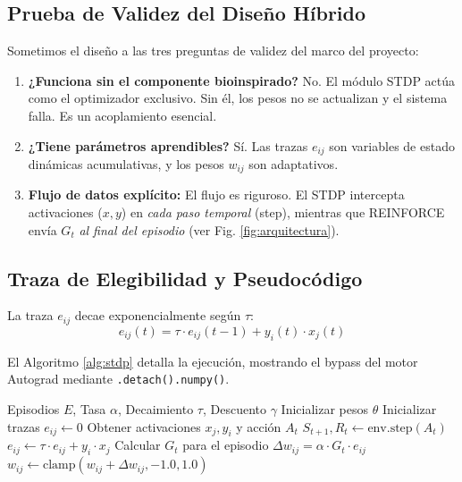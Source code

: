 \documentclass[conference, 10pt]{IEEEtran}
\begin{document}
\subsection{Prueba de Validez del Diseño Híbrido}
Sometimos el diseño a las tres preguntas de validez del marco del proyecto:
\begin{enumerate}
    \item \textbf{¿Funciona sin el componente bioinspirado?} No. El módulo STDP actúa como el optimizador exclusivo. Sin él, los pesos no se actualizan y el sistema falla. Es un acoplamiento esencial.
    \item \textbf{¿Tiene parámetros aprendibles?} Sí. Las trazas $e_{ij}$ son variables de estado dinámicas acumulativas, y los pesos $w_{ij}$ son adaptativos.
    \item \textbf{Flujo de datos explícito:} El flujo es riguroso. El STDP intercepta activaciones ($x, y$) en \textit{cada paso temporal} (step), mientras que REINFORCE envía $G_t$ \textit{al final del episodio} (ver Fig. \ref{fig:arquitectura}).
\end{enumerate}

\subsection{Traza de Elegibilidad y Pseudocódigo}
La traza $e_{ij}$ decae exponencialmente según $\tau$:
\begin{equation}
e_{ij}(t) = \tau \cdot e_{ij}(t-1) + y_i(t) \cdot x_j(t)
\end{equation}

El Algoritmo \ref{alg:stdp} detalla la ejecución, mostrando el bypass del motor Autograd mediante \texttt{.detach().numpy()}.

\begin{algorithm}
\caption{Bucle Híbrido REINFORCE+STDP}\label{alg:stdp}
\begin{algorithmic}[1]
\Require Episodios $E$, Tasa $\alpha$, Decaimiento $\tau$, Descuento $\gamma$
\State Inicializar pesos $\theta$
    \State Inicializar trazas $e_{ij} \gets 0$
        \State Obtener activaciones $x_j, y_i$ y acción $A_t$
        \State $S_{t+1}, R_t \gets \text{env.step}(A_t)$
        \State $e_{ij} \gets \tau \cdot e_{ij} + y_i \cdot x_j$ 
    \EndWhile
    \State Calcular $G_t$ para el episodio
    \State $\Delta w_{ij} = \alpha \cdot G_t \cdot e_{ij}$ 
    \State $w_{ij} \gets \text{clamp}(w_{ij} + \Delta w_{ij}, -1.0, 1.0)$
\EndFor
\end{algorithmic}
\end{algorithm}
\end{document}
